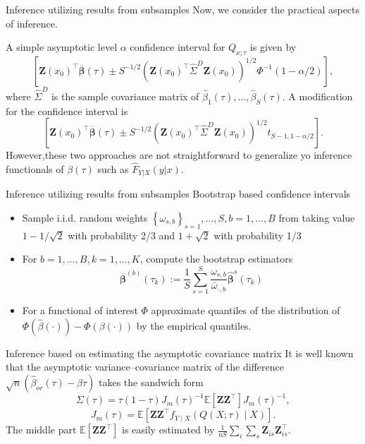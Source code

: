 \documentclass[11pt]{beamer}
\begin{document}
\begin{frame}{Inference utilizing results from subsamples}
Now, we consider the practical aspects of inference.

A simple asymptotic level $\alpha$ confidence interval for $Q_{x;\tau}$ is given by
$$
\left[\mathbf{Z}\left(x_{0}\right)^{\top} \overline{\boldsymbol{\beta}}(\tau) \pm S^{-1 / 2}\left(\mathbf{Z}\left(x_{0}\right)^{\top} \widehat{\Sigma}^{D} \mathbf{Z}\left(x_{0}\right)\right)^{1 / 2} \Phi^{-1}(1-\alpha / 2)\right],
$$
where $\hat{\Sigma}^{D}$ is the sample covariance matrix of $\hat{\beta}_1(\tau),\dots,\hat{\beta}_S(\tau)$. A modification for the confidence interval is
$$
\left[\mathbf{Z}\left(x_{0}\right)^{\top} \overline{\boldsymbol{\beta}}(\tau) \pm S^{-1 / 2}\left(\mathbf{Z}\left(x_{0}\right)^{\top} \widehat{\Sigma}^{D} \mathbf{Z}\left(x_{0}\right)\right)^{1 / 2} t_{S-1,1-\alpha / 2}\right].
$$
However,these two approaches are not straightforward to generalize yo inference functionals of $\beta(\tau)$ such as $\hat{F}_{Y|X}(y|x)$.
\end{frame}

\begin{frame}{Inference utilizing results from subsamples}
Bootstrap based confidence intervals
\begin{itemize}
\item Sample i.i.d. random weights $\left\{\omega_{s, b}\right\}_{s=1}, \ldots, S, b=1, \ldots, B$ from taking value $1-1/\sqrt{2}$ with probability 2/3 and $1+\sqrt{2}$ with probability 1/3
\item For $b=1,\dots,B, k=1,\dots,K$, compute the bootstrap estimators
$$
\overline{\boldsymbol{\beta}}^{(b)}\left(\tau_{k}\right):=\frac{1}{S} \sum_{s=1}^{S} \frac{\omega_{s, b}}{\bar{\omega}_{\cdot, b}} \widehat{\boldsymbol{\beta}}^{s}\left(\tau_{k}\right)
$$
\item For
a functional of interest $\Phi$ approximate quantiles of the distribution of $\Phi(\hat{\beta}(\cdot))-\Phi(\beta(\cdot))$ by the empirical quantiles.
\end{itemize}
\end{frame}


\begin{frame}{Inference based on estimating the asymptotic covariance matrix}
It is well known that the asymptotic variance–covariance matrix of the difference $\sqrt{n}(\hat{\beta}_{or}(\tau)-\beta{\tau})$ takes the sandwich form
$$
\Sigma(\tau)=\tau(1-\tau) J_{m}(\tau)^{-1} \mathbb{E}\left[\mathbf{Z Z}^{\top}\right] J_{m}(\tau)^{-1},
$$
$$
J_{m}(\tau)=\mathbb{E}\left[\mathbf{Z} \mathbf{Z}^{\top} f_{Y \mid X}(Q(X ; \tau) \mid X)\right].
$$
The middle part $\mathbb{E}\left[\mathbf{Z Z}^{\top}\right]$  is easily estimated by
$\frac{1}{n S} \sum_{i} \sum_{s} \mathbf{Z}_{i s} \mathbf{Z}_{i s}^{\top}$.
\end{frame}
\end{document}
